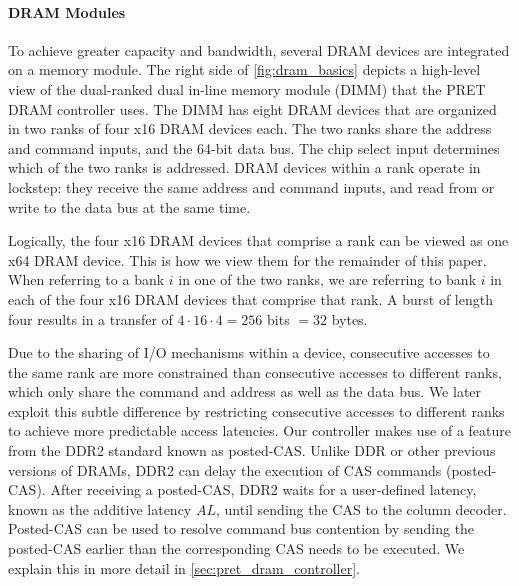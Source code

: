 \vspace{-2.5mm}
\paragraph{DRAM Modules}
To achieve greater capacity and bandwidth, several DRAM devices are integrated on a memory module.
The right side of \ref{fig:dram_basics} depicts a high-level view of the dual-ranked dual in-line memory module (DIMM) that the PRET DRAM controller uses. 
The DIMM has eight DRAM devices that are organized in two ranks of four x16 DRAM devices each.
The two ranks share the address and command inputs, and the 64-bit data bus.
The chip select input determines which of the two ranks is addressed.
DRAM devices within a rank operate in lockstep:
they receive the same address and command inputs, and read from or write to the data bus at the same time.

Logically, the four x16 DRAM devices that comprise a rank can be viewed as one x64 DRAM device.
This is how we view them for the remainder of this paper.
When referring to a bank $i$ in one of the two ranks, we are referring to bank $i$ in each of the four x16 DRAM devices that comprise that rank.
A burst of length four results in a transfer of $4 \cdot 16 \cdot 4 = 256$ bits $= 32$ bytes.

Due to the sharing of I/O mechanisms within a device, consecutive accesses to the same rank are more constrained than consecutive accesses to different ranks, which only share the command and address as well as the data bus.
We later exploit this subtle difference by restricting consecutive accesses to different ranks to achieve more predictable access latencies.  
Our controller makes use of a feature from the DDR2 standard known as posted-CAS.  
Unlike DDR or other previous versions of DRAMs, DDR2 can delay the execution of CAS commands (posted-CAS). 
After receiving a posted-CAS,
DDR2 waits for a user-defined latency, known as the additive latency $AL$, until sending the CAS to the column decoder.
Posted-CAS can be used to resolve command bus contention by sending the posted-CAS earlier than the corresponding CAS needs to be executed.
We explain this in more detail in \ref{sec:pret_dram_controller}. 
% 

